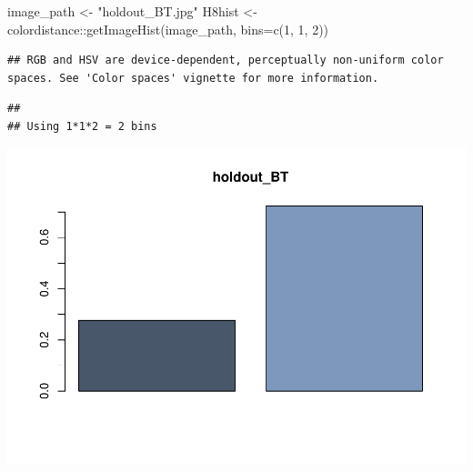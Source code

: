 \documentclass[
]{article}
\newenvironment{Shaded}{\begin{snugshade}}{\end{snugshade}}
\newcommand{\AttributeTok}[1]{\textcolor[rgb]{0.77,0.63,0.00}{#1}}
\newcommand{\DecValTok}[1]{\textcolor[rgb]{0.00,0.00,0.81}{#1}}
\newcommand{\FunctionTok}[1]{\textcolor[rgb]{0.00,0.00,0.00}{#1}}
\newcommand{\NormalTok}[1]{#1}
\newcommand{\OtherTok}[1]{\textcolor[rgb]{0.56,0.35,0.01}{#1}}
\newcommand{\SpecialCharTok}[1]{\textcolor[rgb]{0.00,0.00,0.00}{#1}}
\newcommand{\StringTok}[1]{\textcolor[rgb]{0.31,0.60,0.02}{#1}}
\begin{document}
\begin{Shaded}
\begin{Highlighting}[]
\NormalTok{image\_path }\OtherTok{\textless{}{-}} \StringTok{"holdout\_BT.jpg"}
\NormalTok{H8hist }\OtherTok{\textless{}{-}}\NormalTok{ colordistance}\SpecialCharTok{::}\FunctionTok{getImageHist}\NormalTok{(image\_path, }\AttributeTok{bins=}\FunctionTok{c}\NormalTok{(}\DecValTok{1}\NormalTok{, }\DecValTok{1}\NormalTok{, }\DecValTok{2}\NormalTok{))}
\end{Highlighting}
\end{Shaded}

\begin{verbatim}
## RGB and HSV are device-dependent, perceptually non-uniform color spaces. See 'Color spaces' vignette for more information.
\end{verbatim}

\begin{verbatim}
## 
## Using 1*1*2 = 2 bins
\end{verbatim}

\begin{center}\includegraphics{ProjectPart1_MERGED_files/figure-latex/unnamed-chunk-4-1} \end{center}
\end{document}
